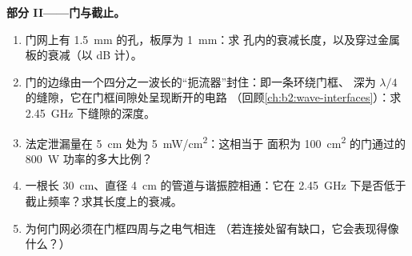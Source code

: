 \begin{problem}
\medskip
\noindent\textbf{部分 II——门与截止。}
\begin{enumerate}[resume]
  \item 门网上有 \qty{1.5}{mm} 的孔，板厚为 \qty{1}{mm}：求
        孔内的衰减长度，以及穿过金属板的衰减（以 dB 计）。
  \item 门的边缘由一个四分之一波长的“扼流器”封住：即一条环绕门框、
        深为 $\lambda/4$ 的缝隙，它在门框间隙处呈现断开的电路
        （回顾\cref{ch:b2:wave-interfaces}）：求
        \qty{2.45}{GHz} 下缝隙的深度。
  \item 法定泄漏量在 \qty{5}{cm} 处为 \qty{5}{mW/cm^2}：这相当于
        面积为 \qty{100}{cm^2} 的门通过的 \qty{800}{W} 功率的多大比例？
  \item 一根长 \qty{30}{cm}、直径 \qty{4}{cm} 的管道与谐振腔相通：它在
        \qty{2.45}{GHz} 下是否低于截止频率？求其长度上的衰减。
  \item 为何门网必须在门框四周与之电气相连
        （若连接处留有缺口，它会表现得像什么？）
\end{enumerate}


\end{problem}
